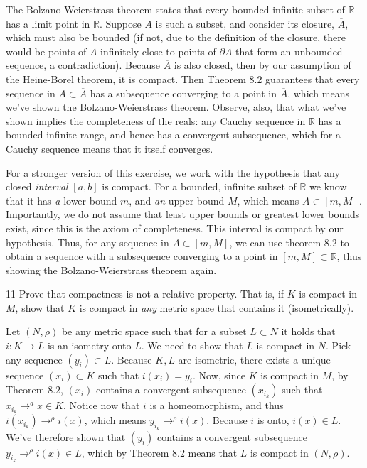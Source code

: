 \begin{solution}
    
    The Bolzano-Weierstrass theorem states that every bounded infinite subset of $\mathbb{R}$ has a limit point in $\mathbb{R}$.
    Suppose $A$ is such a subset, and consider its closure, $\overline{A}$, which must also be bounded (if not, due to the definition of the closure, there would be points of $A$ infinitely close to points of $\partial A$ that form an unbounded sequence, a contradiction).
    Because $\overline{A}$ is also closed, then by our assumption of the Heine-Borel theorem, it is compact.
    Then Theorem 8.2 guarantees that every sequence in $A \subset \overline{A}$ has a subsequence converging to a point in $\overline{A}$, which means we've shown the Bolzano-Weierstrass theorem.
    Observe, also, that what we've shown implies the completeness of the reals: any Cauchy sequence in $\mathbb{R}$ has a bounded infinite range, and hence has a convergent subsequence, which for a Cauchy sequence means that it itself converges.

    For a stronger version of this exercise, we work with the hypothesis that any closed \textit{interval} $[a, b]$ is compact.
    For a bounded, infinite subset of $\mathbb{R}$ we know that it has \textit{a} lower bound $m$, and \textit{an} upper bound $M$, which means $A \subset [m, M]$.
    Importantly, we do not assume that least upper bounds or greatest lower bounds exist, since this is the axiom of completeness.
    This interval is compact by our hypothesis.
    Thus, for any sequence in $A \subset [m, M]$, we can use theorem 8.2 to obtain a sequence with a subsequence converging to a point in $[m, M] \subset \mathbb{R}$, thus showing the Bolzano-Weierstrass theorem again.

\end{solution}

\begin{exercise}{11}
    Prove that compactness is not a relative property.
    That is, if $K$ is compact in $M$, show that $K$ is compact in \textit{any} metric space that contains it (isometrically).
\end{exercise}

\begin{solution}
    
    Let $(N, \rho)$ be any metric space such that for a subset $L \subset N$ it holds that $i: K \rightarrow L$ is an isometry onto $L$. 
    We need to show that $L$ is compact in $N$.
    Pick any sequence $(y_i) \subset L$.
    Because $K, L$ are isometric, there exists a unique sequence $(x_i) \subset K$ such that $i(x_i) = y_i$.
    Now, since $K$ is compact in $M$, by Theorem 8.2, $(x_i)$ contains a convergent subsequence $(x_{i_k})$ such that $x_{i_k} \rightarrow^{d} x \in K$.
    Notice now that $i$ is a homeomorphism, and thus $i(x_{i_k}) \rightarrow^{\rho} i(x)$, which means $y_{i_k} \rightarrow^{\rho} i(x)$.
    Because $i$ is onto, $i(x) \in L$.
    We've therefore shown that $(y_i)$ contains a convergent subsequence $y_{i_k} \rightarrow^{\rho} i(x) \in L$, which by Theorem 8.2 means that $L$ is compact in $(N, \rho)$.
\end{solution}

